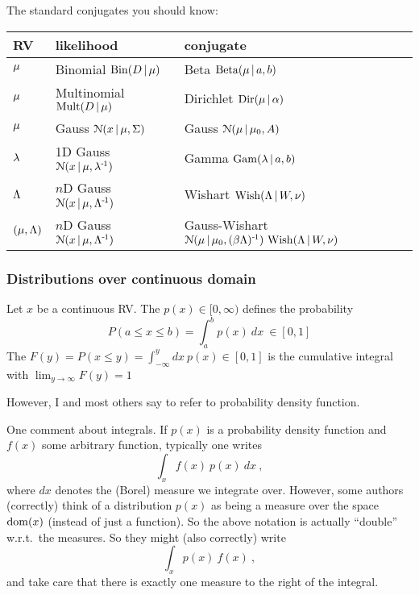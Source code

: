 The standard conjugates you should know:\\
\begin{tabular}{|p{}|@{\quad}p{}|@{\quad}p{}|}
\hline
RV & likelihood & conjugate \\
\hline
$\mu$ & Binomial ${\rm Bin}(D \,|\, \mu)$ & Beta ${\rm Beta}(\mu \,|\, a,b)$ \\
$\mu$ & Multinomial ${\rm Mult}(D \,|\, \mu)$ & Dirichlet ${\rm Dir}(\mu \,|\, \alpha)$ \\
$\mu$ & Gauss ${\cal N}(x \,|\, \mu,\Sigma)$ & Gauss ${\cal N}(\mu \,|\, \mu_0, A)$ \\
$\lambda$ & 1D Gauss ${\cal N}(x \,|\, \mu,\lambda^{{\hspace*{-.0pt}\text{\rm -}\hspace*{-.5pt}}1})$ & Gamma ${\rm Gam}(\lambda \,|\, a,b)$ \\
$\Lambda$ & $n$D Gauss ${\cal N}(x \,|\, \mu,\Lambda^{{\hspace*{-.0pt}\text{\rm -}\hspace*{-.5pt}}1})$ & Wishart ${\rm Wish}(\Lambda \,|\, W, \nu)$ \\
$(\mu,\Lambda)$ & $n$D Gauss ${\cal N}(x \,|\, \mu,\Lambda^{{\hspace*{-.0pt}\text{\rm -}\hspace*{-.5pt}}1})$ & Gauss-Wishart ${\cal N}(\mu\,|\,\mu_0,
(\beta\Lambda)^{{\hspace*{-.0pt}\text{\rm -}\hspace*{-.5pt}}1})~ {\rm Wish}(\Lambda \,|\, W, \nu)$ \\
\hline
\end{tabular}

\subsubsection{Distributions over continuous domain}

\begin{myDefinition}
Let $x$ be a continuous RV. The  $p(x)\in[0,\infty)$ defines the probability 
\begin{equation}
P(a\le x \le b) = \int_a^b p(x)~ dx ~ \in[0,1]
\end{equation}
The  $F(y) = P(x \le y) = \int_{-\infty}^y dx~
p(x)\in[0,1]$ is the cumulative integral with $\lim_{y\to\infty} F(y) = 1$

However, I and most others say  to refer
  to probability density function.
\end{myDefinition}

One comment about integrals. If $p(x)$ is a probability density function
and $f(x)$ some arbitrary function, typically one writes
\begin{equation}
\int_x f(x)~ p(x)~ dx ~,
\end{equation}
where $dx$ denotes the (Borel) measure we
integrate over. However, some authors (correctly) think of a
distribution $p(x)$ as being a measure over the space ${\rm dom}(x)$
(instead of just a function). So the above notation is actually
``double'' w.r.t.\ the measures. So they might (also correctly) write
\begin{equation}
\int_x p(x)~ f(x) ~,
\end{equation}
and take care that there is exactly one
measure to the right of the integral.


